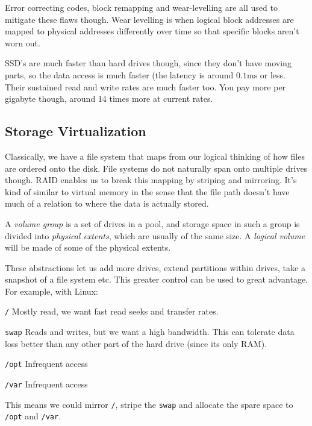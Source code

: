 Error correcting codes, block remapping and wear-levelling are all used to
mitigate these flaws though. Wear levelling is when logical block addresses are
mapped to physical addresses differently over time so that specific blocks
aren't worn out.

SSD's are much faster than hard drives though, since they don't have moving
parts, so the data access is much faster (the latency is around
$0.1\si{\milli\second}$ or less. Their sustained read and write rates are much
faster too. You pay more per gigabyte though, around 14 times more at current
rates.

\subsection{Storage Virtualization}

Classically, we have a file system that maps from our logical thinking of how
files are ordered onto the disk. File systems do not naturally span onto
multiple drives though. RAID enables us to break this mapping by striping and
mirroring. It's kind of similar to virtual memory in the sense that the file
path doesn't have much of a relation to where the data is actually stored.

A \textit{volume group} is a set of drives in a pool, and storage space in such
a group is divided into \textit{physical extents}, which are usually of the same
size. A \textit{logical volume} will be made of some of the physical extents.

These abstractions let us add more drives, extend partitions within drives, take
a snapshot of a file system etc. This greater control can be used to great
advantage. For example, with Linux:

\begin{description}
  \item \texttt{/} Mostly read, we want fast read seeks and transfer rates.
  \item \texttt{swap} Reads and writes, but we want a high bandwidth. This can
  tolerate data loss better than any other part of the hard drive (since its
  only RAM).
  \item \texttt{/opt} Infrequent access
  \item \texttt{/var} Infrequent access
\end{description}

This means we could mirror \texttt{/}, stripe the \texttt{swap} and allocate the
spare space to \texttt{/opt} and \texttt{/var}.

